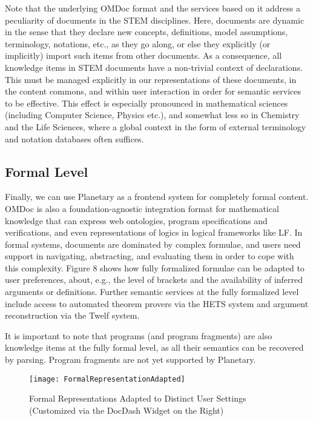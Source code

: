Note that the underlying OMDoc format and the services based on it address a peculiarity
of documents in the STEM disciplines. Here, documents are dynamic in the sense that they
declare new concepts, definitions, model assumptions, terminology, notations, etc., as
they go along, or else they explicitly (or implicitly) import such items from other
documents. As a consequence, all knowledge items in STEM documents have a non-trivial
context of declarations. This must be managed explicitly in our representations of these
documents, in the content commons, and within user interaction in order for semantic
services to be effective. This effect is especially pronounced in mathematical sciences
(including Computer Science, Physics etc.), and somewhat less so in Chemistry and the Life
Sciences, where a global context in the form of external terminology and notation
databases often suffices.

\subsection{Formal Level}

Finally, we can use Planetary as a frontend system for completely formal content. OMDoc is
also a foundation-agnostic integration format for mathematical knowledge that can express
web ontologies, program specifications and verifications, and even representations of
logics in logical frameworks like LF. In formal systems, documents are dominated by
complex formulae, and users need support in navigating, abstracting, and evaluating them
in order to cope with this complexity. Figure 8 shows how fully formalized formulae can be
adapted to user preferences, about, e.g., the level of brackets and the availability of
inferred arguments or definitions. Further semantic services at the fully formalized level
include access to automated theorem provers via the HETS system and argument
reconstruction via the Twelf system.

It is important to note that programs (and program fragments) are also knowledge items at
the fully formal level, as all their semantics can be recovered by parsing. Program
fragments are not yet supported by Planetary.

\begin{figure}[ht]\centering
  \texttt{[image: FormalRepresentationAdapted]}
  \caption{Formal Representations Adapted to Distinct User Settings (Customized via the
    DocDash Widget on the Right)}
\end{figure} 

